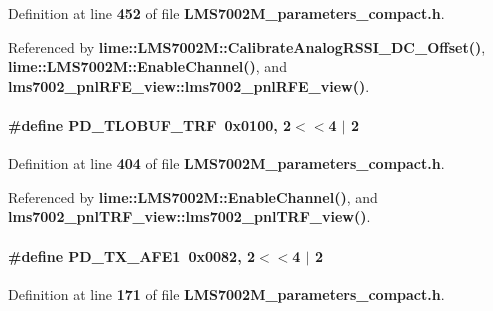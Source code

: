 Definition at line {\bf 452} of file {\bf L\+M\+S7002\+M\+\_\+parameters\+\_\+compact.\+h}.



Referenced by {\bf lime\+::\+L\+M\+S7002\+M\+::\+Calibrate\+Analog\+R\+S\+S\+I\+\_\+\+D\+C\+\_\+\+Offset()}, {\bf lime\+::\+L\+M\+S7002\+M\+::\+Enable\+Channel()}, and {\bf lms7002\+\_\+pnl\+R\+F\+E\+\_\+view\+::lms7002\+\_\+pnl\+R\+F\+E\+\_\+view()}.

\paragraph[{P\+D\+\_\+\+T\+L\+O\+B\+U\+F\+\_\+\+T\+RF}]{\setlength{\rightskip}{0pt plus 5cm}\#define P\+D\+\_\+\+T\+L\+O\+B\+U\+F\+\_\+\+T\+RF~0x0100, 2$<$$<$4 $\vert$  2}\label{LMS7002M__parameters__compact_8h_a2b153838f82f7872120cf45fd7f58cd5}


Definition at line {\bf 404} of file {\bf L\+M\+S7002\+M\+\_\+parameters\+\_\+compact.\+h}.



Referenced by {\bf lime\+::\+L\+M\+S7002\+M\+::\+Enable\+Channel()}, and {\bf lms7002\+\_\+pnl\+T\+R\+F\+\_\+view\+::lms7002\+\_\+pnl\+T\+R\+F\+\_\+view()}.

\paragraph[{P\+D\+\_\+\+T\+X\+\_\+\+A\+F\+E1}]{\setlength{\rightskip}{0pt plus 5cm}\#define P\+D\+\_\+\+T\+X\+\_\+\+A\+F\+E1~0x0082, 2$<$$<$4 $\vert$  2}\label{LMS7002M__parameters__compact_8h_a6ad9376e5abfcf0ae968040527bc5c3d}


Definition at line {\bf 171} of file {\bf L\+M\+S7002\+M\+\_\+parameters\+\_\+compact.\+h}.



